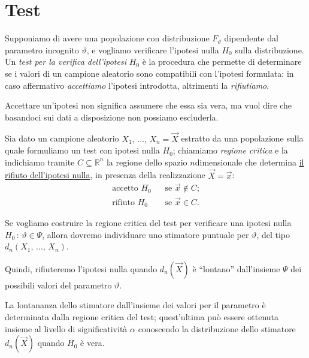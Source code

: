     \section{Test}
        \begin{defn}
            Supponiamo di avere una popolazione con distribuzione $F_\vartheta$ dipendente dal parametro 
            incognito $\vartheta$, e vogliamo verificare l'ipotesi nulla $H_0$ sulla distribuzione.
            Un \emph{test per la verifica dell'ipotesi} $H_0$ è la procedura che permette di determinare se 
            i valori di un campione aleatorio sono compatibili con l'ipotesi formulata: in caso affermativo 
            \emph{accettiamo} l'ipotesi introdotta, altrimenti la \emph{rifiutiamo}.
        \end{defn}
        \begin{note}
            Accettare un'ipotesi non significa assumere che essa sia vera, ma vuol dire che basandoci sui 
            dati a disposizione non possiamo escluderla.
        \end{note}
        \begin{defn}
            Sia dato un campione aleatorio $X_1,\, \ldots,\, X_{n} = \vec{X}$ estratto da una popolazione sulla 
            quale formuliamo un test con ipotesi nulla $H_0$; chiamiamo \emph{regione critica} e la indichiamo 
            tramite $C \subseteq \mathbb{R}^n$ la regione dello spazio $n$\nbdash dimensionale che determina 
            \underline{il rifiuto dell'ipotesi nulla}, in presenza della realizzazione $\vec{X} = \vec{x}$:
            \begin{align*}
                \text{accetto } H_0 & \;\;\; \text{se $\vec{x} \notin C$;} \\
                \text{rifiuto } H_0 & \;\;\; \text{se $\vec{x} \in C$.}
            \end{align*}
        \end{defn}
        \begin{obsv}
            Se vogliamo costruire la regione critica del test per verificare una ipotesi nulla 
            $H_0 \,:\, \vartheta \in \Psi$, allora dovremo individuare uno stimatore puntuale per 
            $\vartheta$, del tipo $d_n(X_1,\, \ldots,\, X_{n})$.

            Quindi, rifiuteremo l'ipotesi nulla quando $d_n(\vec{X})$ è ``lontano'' dall'insieme $\Psi$ dei 
            possibili valori del parametro $\vartheta$.

            La lontananza dello stimatore dall'insieme dei valori per il parametro è determinata dalla
            regione critica del test; quest'ultima può essere ottenuta insieme al livello di significatività 
            $\alpha$ conoscendo la distribuzione dello stimatore $d_n(\vec{X})$ quando $H_0$ è vera.
        \end{obsv}
